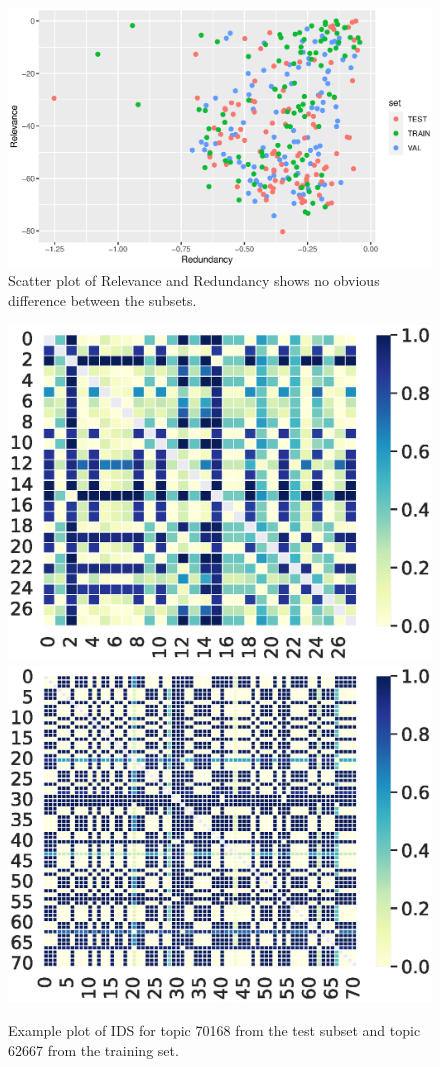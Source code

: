 \documentclass[../main.tex]{subfiles}
\begin{document}
\begin{figure}
    \includegraphics[width=\textwidth]{figures/analysis-2.eps}
    \caption{Scatter plot of Relevance and Redundancy shows no obvious difference between the subsets.} \label{fig:analysis-2}
\end{figure}


\begin{figure}
    \includegraphics[width=.49\textwidth]{figures/test70168.eps}
    \includegraphics[width=.49\textwidth]{figures/train62667.eps}
    \caption{Example plot of IDS for topic 70168 from the test subset and topic 62667 from the training set.} \label{fig:analysis-ids-test}
\end{figure}
\end{document}
